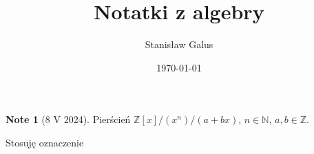 \documentclass[a4paper,11pt]{article}
\title{Notatki z algebry}
\author{Stanisław Galus}
\date{\today}
\newcommand{\naturaln}{\ensuremath{\mathbb{N}}}
\newcommand{\integern}{\ensuremath{\mathbb{Z}}}
\theoremstyle{definition}
\newtheorem{note}{Note}
\begin{document}
\begingroup
\renewcommand{\thepage}{0}
\maketitle
\endgroup
\tableofcontents

\begin{note}[8 V 2024] \label{note:fmvrv}
  Pierścień $\integern[x] / (x^n) / (a + bx)$, $n \in \naturaln$, $a, b \in \integern$.

  Stosuję oznaczenie
\end{note}



\end{document}
